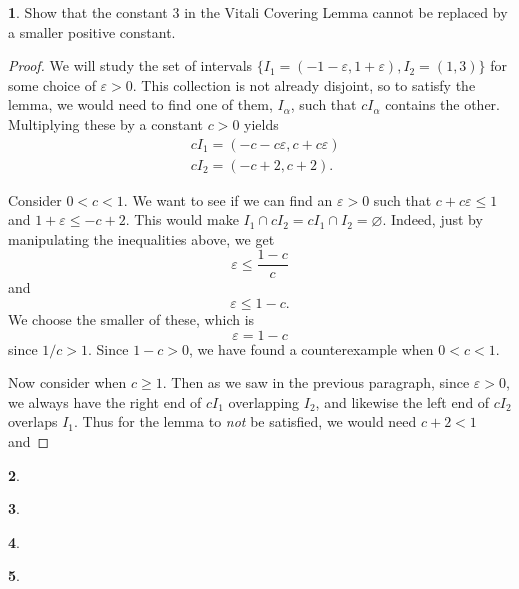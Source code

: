 \documentclass[12pt]{article}
\theoremstyle{definition}
\newtheorem{ex}{}
\newenvironment{exercise}[1]{
	\renewcommand{\theex}{#1}
	\begin{ex}
		}{\end{ex}}
\begin{document}
\begin{exercise}{4}
	Show that the constant 3 in the Vitali Covering Lemma cannot be replaced by a smaller positive constant.
\end{exercise}
\begin{proof}
	We will study the set of intervals $\lbrace I_1 = (-1 - \varepsilon, 1 + \varepsilon), I_2 = (1, 3)\rbrace$ for some choice of $\varepsilon > 0$.
	This collection is not already disjoint, so to satisfy the lemma, we would need to find one of them, $I_\alpha$, such that $cI_\alpha$ contains the other.
	Multiplying these by a constant $c > 0$ yields \begin{align*}
		 & cI_1 = (-c - c\varepsilon, c + c\varepsilon) \\
		 & cI_2 = (-c + 2, c + 2).
	\end{align*}

	Consider $0 < c < 1$.
  We want to see if we can find an $\varepsilon > 0$ such that $c + c\varepsilon \leq 1$ and $1 + \varepsilon \leq -c + 2$.
  This would make $I_1 \cap cI_2 = cI_1 \cap I_2 = \varnothing$.
  Indeed, just by manipulating the inequalities above, we get \begin{equation*}
    \varepsilon \leq \frac{1-c}{c}
  \end{equation*}
  and \begin{equation*}
    \varepsilon \leq 1 - c.
  \end{equation*}
  We choose the smaller of these, which is \begin{equation*}
    \varepsilon = 1 - c
  \end{equation*}
  since $1/c > 1$.
  Since $1 - c > 0$, we have found a counterexample when $0 < c < 1$.

	Now consider when $c \geq 1$.
	Then as we saw in the previous paragraph, since $\varepsilon > 0$, we always have the right end of $cI_1$ overlapping $I_2$, and likewise the left end of $cI_2$ overlaps $I_1$.
	Thus for the lemma to \textit{not} be satisfied, we would need $c + 2 < 1$ and 
\end{proof}

\begin{exercise}{6}
\end{exercise}

\begin{exercise}{9}
\end{exercise}

\begin{exercise}{10}
\end{exercise}

\begin{exercise}{12}
\end{exercise}
\end{document}
